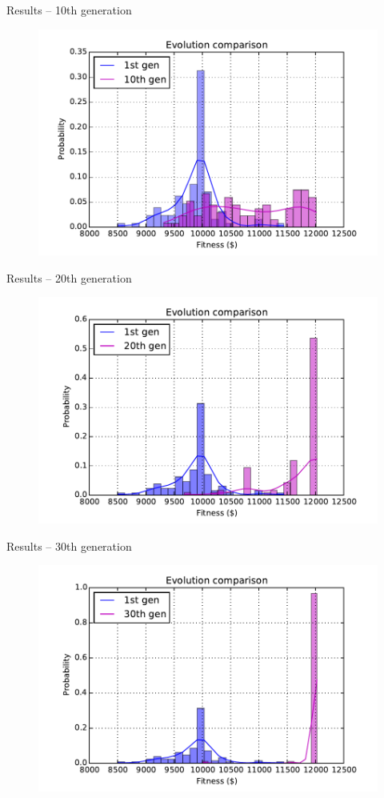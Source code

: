 \documentclass[12pt,portuguese]{beamer}
\begin{document}
\begin{frame}{Results -- 10th generation}
	\begin{figure}[h]
	\centering
	\includegraphics[width=0.9\columnwidth]{images/10r_100.pdf}
	\end{figure}
\end{frame}

\begin{frame}{Results -- 20th generation}
	\begin{figure}[h]
	\centering
	\includegraphics[width=0.9\columnwidth]{images/20r_100.pdf}
	\end{figure}
\end{frame}

\begin{frame}{Results -- 30th generation}
	\begin{figure}[h]
	\centering
	\includegraphics[width=0.9\columnwidth]{images/30r_100.pdf}
	\end{figure}
\end{frame}
\end{document}
